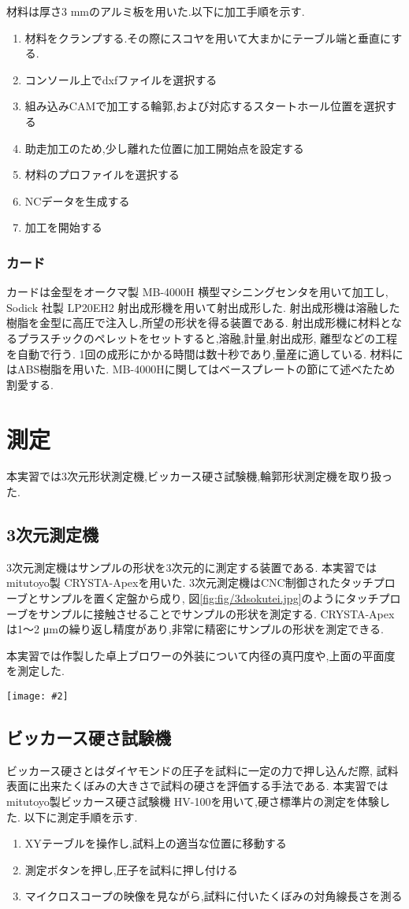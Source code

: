 \documentclass[uplatex,a4j,11pt,dvipdfmx]{jsreport}
\makeatletter
\def\fgcaption{\def\@captype{figure}\caption}
\newcommand{\mfig}[3][width=15cm]{
\begin{center}
\texttt{[image: \#2]}
\fgcaption{#3 \label{fig:#2}}
\end{center}
}
\makeatother
\begin{document}
  材料は厚さ3 mmのアルミ板を用いた.以下に加工手順を示す.
  \begin{enumerate}
    \item 材料をクランプする.その際にスコヤを用いて大まかにテーブル端と垂直にする.
    \item コンソール上でdxfファイルを選択する
    \item 組み込みCAMで加工する輪郭,および対応するスタートホール位置を選択する
    \item 助走加工のため,少し離れた位置に加工開始点を設定する
    \item 材料のプロファイルを選択する
    \item NCデータを生成する
    \item 加工を開始する
  \end{enumerate}
  \subsection{カード}
  カードは金型をオークマ製 MB-4000H 横型マシニングセンタを用いて加工し,
  Sodick 社製 LP20EH2 射出成形機を用いて射出成形した.
  射出成形機は溶融した樹脂を金型に高圧で注入し,所望の形状を得る装置である.
  射出成形機に材料となるプラスチックのペレットをセットすると,溶融,計量,射出成形,
  離型などの工程を自動で行う.
  1回の成形にかかる時間は数十秒であり,量産に適している.
  材料にはABS樹脂を用いた.
  MB-4000Hに関してはベースプレートの節にて述べたため割愛する.
  \chapter{測定}
  本実習では3次元形状測定機,ビッカース硬さ試験機,輪郭形状測定機を取り扱った.
  \section{3次元測定機}
  3次元測定機はサンプルの形状を3次元的に測定する装置である.
  本実習ではmitutoyo製 CRYSTA-Apexを用いた.
  3次元測定機はCNC制御されたタッチプローブとサンプルを置く定盤から成り,
  図\ref{fig:fig/3dsokutei.jpg}のようにタッチプローブをサンプルに接触させることでサンプルの形状を測定する.
  CRYSTA-Apexは1～2 μmの繰り返し精度があり,非常に精密にサンプルの形状を測定できる.\cite{crysta:online}

  本実習では作製した卓上ブロワーの外装について内径の真円度や,上面の平面度を測定した.
  \mfig[width=7cm]{fig/3dsokutei.jpg}{3次元測定機のタッチプローブとサンプル}
  \section{ビッカース硬さ試験機}
  ビッカース硬さとはダイヤモンドの圧子を試料に一定の力で押し込んだ際,
  試料表面に出来たくぼみの大きさで試料の硬さを評価する手法である.
  本実習ではmitutoyo製ビッカース硬さ試験機 HV-100を用いて,硬さ標準片の測定を体験した.
  以下に測定手順を示す.
  \begin{enumerate}
    \item XYテーブルを操作し,試料上の適当な位置に移動する
    \item 測定ボタンを押し,圧子を試料に押し付ける
    \item マイクロスコープの映像を見ながら,試料に付いたくぼみの対角線長さを測る
  \end{enumerate}
\end{document}
